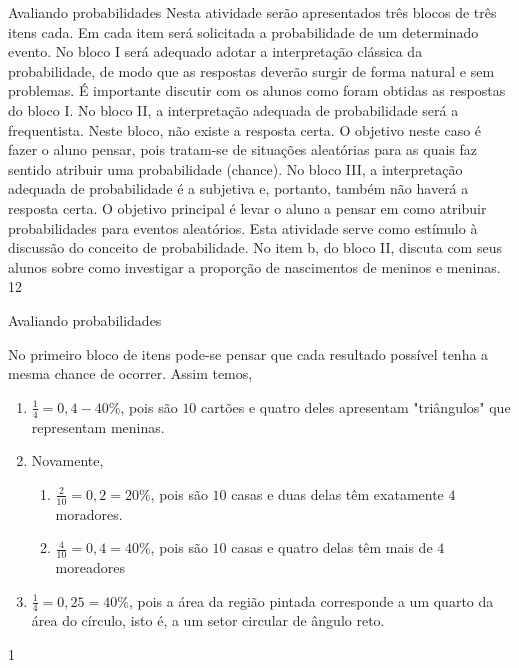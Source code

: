 \begin{sugestions}{Avaliando probabilidades}
{
Nesta atividade serão apresentados três blocos de três itens cada. Em cada item será solicitada a probabilidade de um determinado evento. No bloco I será adequado adotar a interpretação clássica da probabilidade, de modo que as respostas deverão surgir de forma natural e sem problemas. É importante discutir com os alunos como foram obtidas as respostas do bloco I. No bloco II, a interpretação adequada de probabilidade será a frequentista. Neste bloco, não existe a resposta certa. O objetivo neste caso é fazer o aluno pensar, pois tratam-se de situações aleatórias para as quais faz sentido atribuir uma probabilidade (chance). No bloco III, a interpretação adequada de probabilidade é a subjetiva e, portanto, também não haverá a resposta certa. O objetivo principal é levar o aluno a pensar em como atribuir probabilidades para eventos aleatórios. Esta atividade serve como estímulo à discussão do conceito de probabilidade. No item b, do bloco II, discuta com seus alunos sobre como investigar a proporção de nascimentos de meninos e meninas.
}{1}{2}
\end{sugestions}
\begin{answer}{Avaliando probabilidades}
{No primeiro bloco de itens pode-se pensar que cada resultado possível tenha a mesma chance de ocorrer. Assim temos,
\begin{enumerate}
\item $\frac{1}{4}=0{,}4-40\%$, pois são $10$ cartões e quatro deles apresentam "triângulos"{} que representam meninas.
\item Novamente,
\begin{enumerate}
\item $\frac{2}{10}=0{,}2=20\%$, pois são $10$ casas e duas delas têm exatamente $4$ moradores.
\item $\frac{4}{10}=0{,}4=40\%$, pois são $10$ casas e quatro delas têm mais de $4$ moreadores
\end{enumerate}
\item $\frac{1}{4}=0{,}25=40\%$, pois a área da região pintada corresponde a um quarto da área do círculo, isto é, a um setor circular de ângulo reto.
\end{enumerate}
}{1}
\end{answer}
\clearmargin
